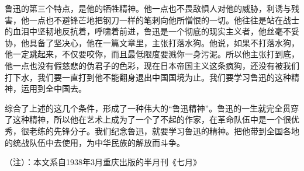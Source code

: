 鲁迅的第三个特点，是他的牺牲精神。他一点也不畏敌惧人对他的威胁，利诱与残害，他一点也不避锋芒地把钢刀一样的笔剌向他所憎恨的一切。他往往是站在战士的血泪中坚韧地反抗着，呼啸着前进，鲁迅是一个彻底的现实主义者，他丝毫不妥协，他具备了坚决心，他在一篇文章里，主张打落水狗。他说，如果不打落水狗，他一定跳起来，不仅要咬你，而且最低限度要溅你一身污泥。所以他主张打到底，他一点也没有假慈悲的伪君子的色彩，现在日本帝国主义这条疯狗，还没有被我们打下水，我们要一直打到他不能翻身退出中国国境为止。我们要学习鲁迅的这种精神，运用到全中国去。

综合了上述的这几个条件，形成了一种伟大的“鲁迅精神”。鲁迅的一生就完全贯穿了这种精神，所以他在艺术上成为了一个了不起的作家，在革命队伍中是一个很优秀，很老练的先锋分子。我们纪念鲁迅，就要学习鲁迅的精神。把他带到全国各地的统战队伍中去使用，为中华民族的解放而斗争。

（注）：本文系自1938年3月重庆出版的半月刊《七月》

